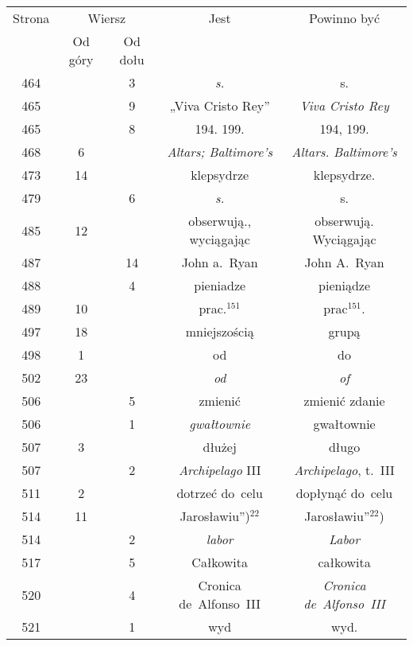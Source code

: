 \documentclass[a4paper,11pt]{article}
\numberwithin{equation}{section}
\begin{document}
\begin{center}
  \newpage

  \begin{tabular}{|c|c|c|c|c|}
    \hline
    Strona & \multicolumn{2}{c|}{Wiersz} & Jest
                              & Powinno być \\ \cline{2-3}
    & Od góry & Od dołu & & \\
    \hline
    464 & & \hphantom{0}3 & \textit{s.} & s. \\
    465 & & \hphantom{0}9 & „Viva Cristo Rey” & \textit{Viva Cristo Rey} \\
    465 & & \hphantom{0}8 & 194. 199. & 194, 199. \\
    468 & \hphantom{0}6 & & \textit{Altars; Baltimore's}
    & \textit{Altars. Baltimore's} \\
    473 & 14 & & klepsydrze & klepsydrze. \\
    479 & & \hphantom{0}6 & \textit{s.} & s. \\
    485 & 12 & & obserwują., wyciągając & obserwują. Wyciągając \\
    487 & & 14 & John a.~Ryan & John A.~Ryan \\
    488 & & \hphantom{0}4 & pieniadze & pieniądze \\
    489 & 10 & & prac.$^{151}$ & prac$^{151}$. \\
    497 & 18 & & mniejszością & grupą \\
    498 & \hphantom{0}1 & & od & do \\
    502 & 23 & & \textit{od} & \textit{of} \\
    506 & & \hphantom{0}5 & zmienić & zmienić zdanie \\
    506 & & \hphantom{0}1 & \textit{gwałtownie} & gwałtownie \\
    507 & \hphantom{0}3 & & dłużej & długo \\
    507 & & \hphantom{0}2 & \textit{Archipelago} III
    & \textit{Archipelago}, t.~III \\
    511 & \hphantom{0}2 & & dotrzeć do~celu & dopłynąć do~celu \\
    514 & 11 & & Jarosławiu”)$^{ 22 }$ & Jarosławiu”$^{ 22 }$) \\
    514 & & \hphantom{0}2 & \textit{labor} & \textit{Labor} \\
    517 & & \hphantom{0}5 & Całkowita & całkowita \\
    520 & & \hphantom{0}4 & Cronica de~Alfonso~III
    & \textit{Cronica de~Alfonso~III} \\
    521 & & \hphantom{0}1 & wyd & wyd. \\

\end{tabular}
\end{center}
\end{document}
